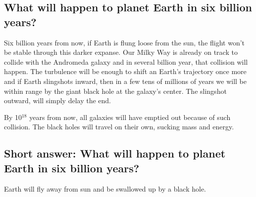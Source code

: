 \subsection*{What will happen to planet Earth in six billion years?}
Six billion years from now, if Earth is flung loose from the sun, the flight won't be stable through this darker expanse. Our Milky Way is already on track to collide with the Andromeda galaxy and in several billion year, that collision will happen. The turbulence will be enough to shift an Earth's trajectory once more and if Earth slingshots inward, then in a few tens of millions of years we will be within range by the giant black hole at the galaxy's center. The slingshot outward, will simply delay the end.

By 10$^{18}$ years from now, all galaxies will have emptied out because of such collision. The black holes will travel on their own, sucking mass and energy.

\subsection*{Short answer: What will happen to planet Earth in six billion years?}
Earth will fly away from sun and be swallowed up by a black hole.
